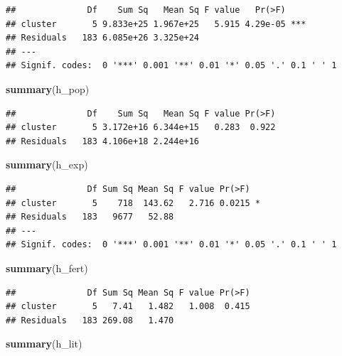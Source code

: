 \documentclass[]{article}
\newenvironment{Shaded}{\begin{snugshade}}{\end{snugshade}}
\newcommand{\KeywordTok}[1]{\textcolor[rgb]{0.13,0.29,0.53}{\textbf{#1}}}
\newcommand{\NormalTok}[1]{#1}
\begin{document}
\begin{verbatim}
##              Df    Sum Sq   Mean Sq F value   Pr(>F)    
## cluster       5 9.833e+25 1.967e+25   5.915 4.29e-05 ***
## Residuals   183 6.085e+26 3.325e+24                     
## ---
## Signif. codes:  0 '***' 0.001 '**' 0.01 '*' 0.05 '.' 0.1 ' ' 1
\end{verbatim}

\begin{Shaded}
\begin{Highlighting}[]
\KeywordTok{summary}\NormalTok{(h_pop)}
\end{Highlighting}
\end{Shaded}

\begin{verbatim}
##              Df    Sum Sq   Mean Sq F value Pr(>F)
## cluster       5 3.172e+16 6.344e+15   0.283  0.922
## Residuals   183 4.106e+18 2.244e+16
\end{verbatim}

\begin{Shaded}
\begin{Highlighting}[]
\KeywordTok{summary}\NormalTok{(h_exp)}
\end{Highlighting}
\end{Shaded}

\begin{verbatim}
##              Df Sum Sq Mean Sq F value Pr(>F)  
## cluster       5    718  143.62   2.716 0.0215 *
## Residuals   183   9677   52.88                 
## ---
## Signif. codes:  0 '***' 0.001 '**' 0.01 '*' 0.05 '.' 0.1 ' ' 1
\end{verbatim}

\begin{Shaded}
\begin{Highlighting}[]
\KeywordTok{summary}\NormalTok{(h_fert)}
\end{Highlighting}
\end{Shaded}

\begin{verbatim}
##              Df Sum Sq Mean Sq F value Pr(>F)
## cluster       5   7.41   1.482   1.008  0.415
## Residuals   183 269.08   1.470
\end{verbatim}

\begin{Shaded}
\begin{Highlighting}[]
\KeywordTok{summary}\NormalTok{(h_lit)}
\end{Highlighting}
\end{Shaded}
\end{document}
